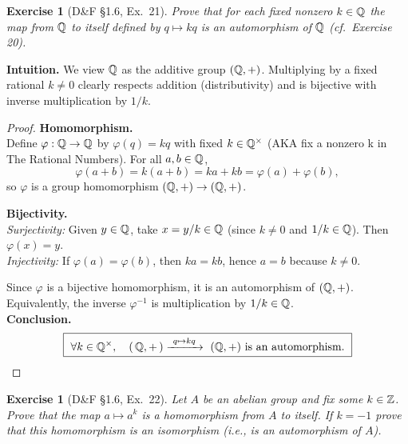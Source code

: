 \documentclass[12pt]{article}
\newtheorem{exercise}[theorem]{Exercise}
\theoremstyle{definition}
\begin{document}
\newpage

\begin{exercise}[D\&F §1.6, Ex.~21]
Prove that for each fixed nonzero $k\in\Bbb Q$ the map from $\Bbb Q$ to itself defined by $q\mapsto kq$ is an automorphism of $\Bbb Q$ (cf.\ Exercise 20). %
\end{exercise}

\dotfill

\noindent\textbf{Intuition.}
We view $\Bbb Q$ as the additive group $(\Bbb Q,+)$. Multiplying by a fixed rational $k\neq0$ clearly respects addition (distributivity) and is bijective with inverse multiplication by $1/k$.\\

\dotfill

\begin{proof}
\noindent\textbf{Homomorphism.}\\
\noindent Define $\varphi:\Bbb Q\to\Bbb Q$ by $\varphi(q)=kq$ with fixed $k\in\Bbb Q^\times$ (AKA fix a nonzero k in The Rational Numbers). For all $a,b\in\Bbb Q$,
\[
\varphi(a+b)=k(a+b)=ka+kb=\varphi(a)+\varphi(b),
\]
so $\varphi$ is a group homomorphism $(\Bbb Q,+)\to(\Bbb Q,+)$. %

\noindent\textbf{Bijectivity.}\\
\noindent \emph{Surjectivity:} Given $y\in\Bbb Q$, take $x=y/k\in\Bbb Q$ (since $k\neq0$ and $1/k\in\Bbb Q$). Then $\varphi(x)=y$.\\
\noindent \emph{Injectivity:} If $\varphi(a)=\varphi(b)$, then $ka=kb$, hence $a=b$ because $k\neq0$. %

\noindent Since $\varphi$ is a bijective homomorphism, it is an automorphism of $(\Bbb Q,+)$. Equivalently, the inverse $\varphi^{-1}$ is multiplication by $1/k\in\Bbb Q$.\\

\noindent\textbf{Conclusion.}
\[
\boxed{\ \forall k\in\Bbb Q^\times,\quad (\,\Bbb Q,+\,)\xrightarrow{\ q\mapsto kq\ }\ (\Bbb Q,+)\ \text{is an automorphism.}\ }
\]
\end{proof}

\newpage

\begin{exercise}[D\&F §1.6, Ex.~22]
Let $A$ be an abelian group and fix some $k\in\Bbb Z$. Prove that the map $a\mapsto a^{k}$ is a homomorphism from $A$ to itself. If $k=-1$ prove that this homomorphism is an isomorphism (i.e., is an automorphism of $A$).
\end{exercise}
\end{document}
